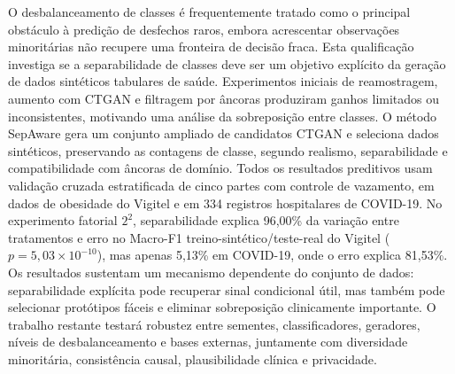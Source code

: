 O desbalanceamento de classes é frequentemente tratado como o principal obstáculo à predição de desfechos raros, embora acrescentar observações minoritárias não recupere uma fronteira de decisão fraca. Esta qualificação investiga se a separabilidade de classes deve ser um objetivo explícito da geração de dados sintéticos tabulares de saúde. Experimentos iniciais de reamostragem, aumento com CTGAN e filtragem por âncoras produziram ganhos limitados ou inconsistentes, motivando uma análise da sobreposição entre classes. O método SepAware gera um conjunto ampliado de candidatos CTGAN e seleciona dados sintéticos, preservando as contagens de classe, segundo realismo, separabilidade e compatibilidade com âncoras de domínio. Todos os resultados preditivos usam validação cruzada estratificada de cinco partes com controle de vazamento, em dados de obesidade do Vigitel e em 334 registros hospitalares de COVID-19. No experimento fatorial $2^2$, separabilidade explica 96,00\% da variação entre tratamentos e erro no Macro-F1 treino-sintético/teste-real do Vigitel ($p=5,03\times10^{-10}$), mas apenas 5,13\% em COVID-19, onde o erro explica 81,53\%. Os resultados sustentam um mecanismo dependente do conjunto de dados: separabilidade explícita pode recuperar sinal condicional útil, mas também pode selecionar protótipos fáceis e eliminar sobreposição clinicamente importante. O trabalho restante testará robustez entre sementes, classificadores, geradores, níveis de desbalanceamento e bases externas, juntamente com diversidade minoritária, consistência causal, plausibilidade clínica e privacidade.
